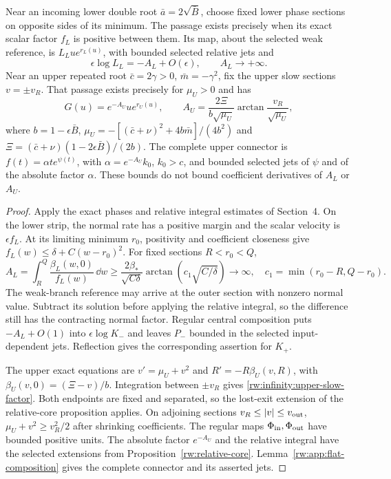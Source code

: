 \begin{lemma}\label{rw:infinity:fixed-strips}
Near an incoming lower double root $\bar a=2\sqrt{\bar B}$,
choose fixed lower phase sections on opposite sides of its minimum.
The passage exists precisely when its exact scalar factor $f_L$ is
positive between them. Its map, about the selected weak reference, is
$L_Lu e^{r_L(u)}$, with bounded selected relative jets and
\[
 \epsilon\log L_L=-A_L+O(\epsilon),\qquad A_L\longrightarrow+\infty.
\]
Near an upper repeated root $\bar c=2\gamma>0$,
$\bar m=-\gamma^2$, fix the upper slow sections $v=\pm v_R$.
That passage exists precisely for $\mu_U>0$ and has
\begin{equation}\label{rw:infinity:upper-slow-factor}
 G(u)=e^{-A_U}u e^{r_U(u)},\qquad
 A_U=\frac{2\Xi}{b\sqrt{\mu_U}}\arctan\frac{v_R}{\sqrt{\mu_U}},
\end{equation}
where $b=1-\epsilon\bar B$,
$\mu_U=-[(\bar c+\nu)^2+4b\bar m]/(4b^2)$ and
$\Xi=(\bar c+\nu)(1-2\epsilon\bar B)/(2b)$.
The complete upper connector is
$f(t)=\alpha t e^{\psi(t)}$, with
$\alpha=e^{-A_U}k_0$, $k_0>c$, and bounded selected jets of
$\psi$ and of the absolute factor $\alpha$.
These bounds do not bound coefficient derivatives of $A_L$ or $A_U$.
\end{lemma}
\begin{proof}
Apply the exact phases and relative integral estimates of Section~4.
On the lower strip, the normal rate has a positive margin and the
scalar velocity is $\epsilon f_L$. At its limiting minimum
$r_0$, positivity and coefficient closeness give
$f_L(w)\le\delta+C(w-r_0)^2$. For fixed sections $R<r_0<Q$,
\[
 A_L=\int_R^Q\frac{\beta_L(w,0)}{f_L(w)}\,\dd w
 \ge\frac{2\beta_*}{\sqrt{C\delta}}
       \arctan\left(c_1\sqrt{C/\delta}\right)\longrightarrow\infty,
 \quad c_1=\min(r_0-R,Q-r_0).
\]
The weak-branch reference may arrive at the outer section with
nonzero normal value. Subtract its solution before applying the
relative integral, so the difference still has the contracting normal
factor. Regular central composition puts $-A_L+O(1)$ into
$\epsilon\log K_-$ and leaves $P_-$ bounded in the selected
input-dependent jets. Reflection gives the corresponding assertion
for $K_+$.

The upper exact equations are $v'=\mu_U+v^2$ and
$R'=-R\beta_U(v,R)$, with
$\beta_U(v,0)=(\Xi-v)/b$.
Integration between $\pm v_R$ gives
\eqref{rw:infinity:upper-slow-factor}. Both endpoints are fixed and
separated, so the lost-exit extension of the relative-core proposition
applies. On adjoining sections $v_R\le|v|\le v_{\rm out}$,
$\mu_U+v^2\ge v_R^2/2$ after shrinking coefficients. The regular
maps $\Phi_{\rm in},\Phi_{\rm out}$ have bounded positive units.
The absolute factor $e^{-A_U}$ and the relative integral have the
selected extensions from Proposition~\ref{rw:relative-core}.
Lemma~\ref{rw:app:flat-composition} gives the complete connector
and its asserted jets.
\end{proof}

